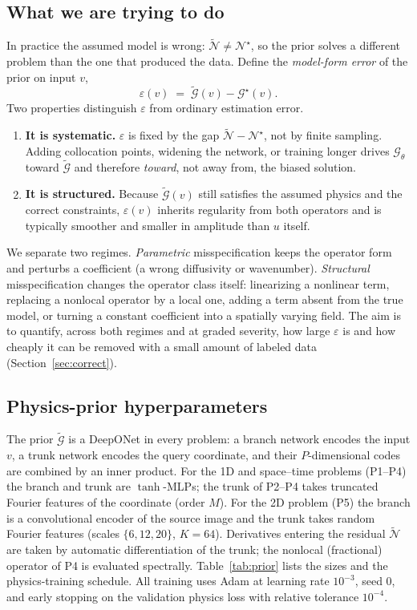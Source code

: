 \documentclass[11pt]{article}
\newcommand{\Gtrue}{\mathcal{G}^{\star}}
\newcommand{\Gprior}{\widetilde{\mathcal{G}}}
\newcommand{\Ntrue}{\mathcal{N}^{\star}}
\newcommand{\Nass}{\widetilde{\mathcal{N}}}
\begin{document}
\subsection{What we are trying to do}
\label{sec:theory}
In practice the assumed model is wrong: $\Nass\neq\Ntrue$, so the prior solves a different
problem than the one that produced the data. Define the \emph{model-form error} of the prior on
input $v$,
\begin{equation}
\label{eq:bias}
\varepsilon(v) \;=\; \Gprior(v) - \Gtrue(v).
\end{equation}
Two properties distinguish $\varepsilon$ from ordinary estimation error.
\begin{enumerate}[leftmargin=1.4em,itemsep=2pt]
\item \textbf{It is systematic.} $\varepsilon$ is fixed by the gap $\Nass-\Ntrue$, not by finite
sampling. Adding collocation points, widening the network, or training longer drives
$\mathcal{G}_\theta$ toward $\Gprior$ and therefore \emph{toward}, not away from, the biased
solution.
\item \textbf{It is structured.} Because $\Gprior(v)$ still satisfies the assumed physics and the
correct constraints, $\varepsilon(v)$ inherits regularity from both operators and is typically
smoother and smaller in amplitude than $u$ itself.
\end{enumerate}
We separate two regimes. \emph{Parametric} misspecification keeps the operator form and perturbs
a coefficient (a wrong diffusivity or wavenumber). \emph{Structural} misspecification changes
the operator class itself: linearizing a nonlinear term, replacing a nonlocal operator by a local
one, adding a term absent from the true model, or turning a constant coefficient into a spatially
varying field. The aim is to quantify, across both regimes and at graded severity, how large
$\varepsilon$ is and how cheaply it can be removed with a small amount of labeled data
(Section~\ref{sec:correct}).

\subsection{Physics-prior hyperparameters}
\label{sec:prior-hparams}
The prior $\Gprior$ is a DeepONet in every problem: a branch network encodes the input $v$, a
trunk network encodes the query coordinate, and their $P$-dimensional codes are combined by an
inner product. For the 1D and space--time problems (P1--P4) the branch and trunk are
$\tanh$-MLPs; the trunk of P2--P4 takes truncated Fourier features of the coordinate (order $M$).
For the 2D problem (P5) the branch is a convolutional encoder of the source image and the trunk
takes random Fourier features (scales $\{6,12,20\}$, $K=64$). Derivatives entering the residual
$\Nass$ are taken by automatic differentiation of the trunk; the nonlocal (fractional) operator
of P4 is evaluated spectrally. Table~\ref{tab:prior} lists the sizes and the physics-training
schedule. All training uses Adam at learning rate $10^{-3}$, seed $0$, and early stopping on the
validation physics loss with relative tolerance $10^{-4}$.
\end{document}
